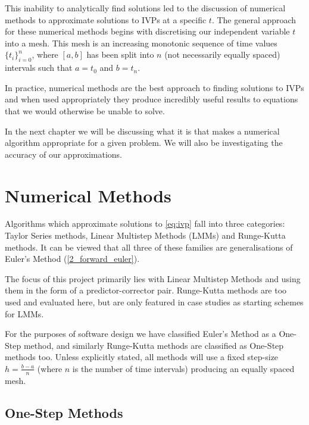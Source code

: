\documentclass[12pt, twoside]{report}
\theoremstyle{plain}
\theoremstyle{definition}
\theoremstyle{definition}
\begin{document}
        This inability to analytically find solutions led to the discussion of
        numerical methods to approximate solutions to IVPs at a specific $t$. 
        The general approach for these numerical methods begins with 
        discretising our independent variable $t$ into a mesh. This mesh is an 
        increasing monotonic sequence of time values ${\lbrace 
        t_i\rbrace}_{i=0}^n$, where $[a,b]$ has been split into $n$ (not 
        necessarily equally spaced) intervals such that $a=t_0$ and $b=t_n$.

        In practice, numerical methods are the best approach to finding 
        solutions to IVPs and when used appropriately they produce incredibly 
        useful results to equations that we would otherwise be unable to solve.

        In the next chapter we will be discussing what it is that makes a 
        numerical algorithm appropriate for a given problem. We will also be
        investigating the accuracy of our approximations.



\chapter{Numerical Methods}
\label{2_methods}
    Algorithms which approximate solutions to \eqref{eq:ivp} fall into three
    categories: Taylor Series methods, Linear Multistep Methods (LMMs) and 
    Runge-Kutta methods. It can be viewed that all three of these families are
    generalisations of Euler's Method (\ref{2_forward_euler}). 

    The focus of this project primarily lies with Linear Multistep Methods and 
    using them in the form of a predictor-corrector pair. Runge-Kutta methods
    are too used and evaluated here, but are only featured in case studies
    as starting schemes for LMMs.

    For the purposes of software design we have classified Euler's Method as a
    One-Step method, and similarly Runge-Kutta methods are classified as 
    One-Step methods too. Unless explicitly stated, all methods will use a 
    fixed step-size $h=\frac{b-a}{n}$ (where $n$ is the number of time 
    intervals) producing an equally spaced mesh.

    \section{One-Step Methods}
    \label{2_onestep}
        
\end{document}
